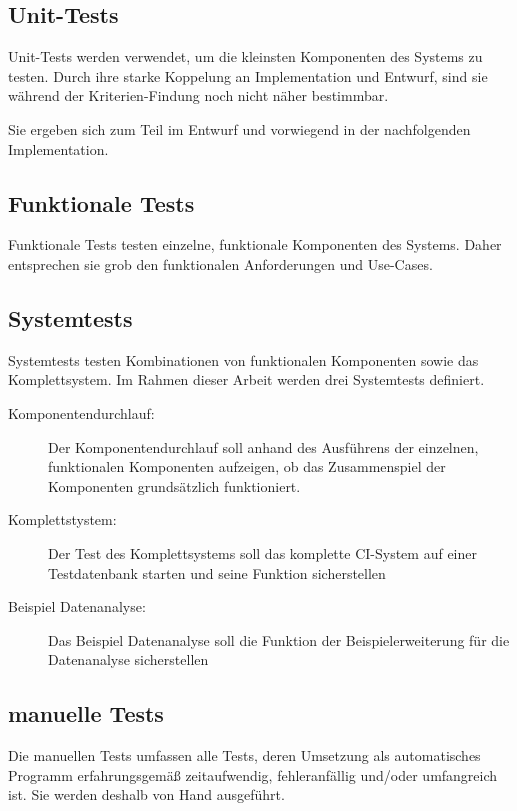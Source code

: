 \subsection{Unit-Tests}

Unit-Tests werden verwendet, um die kleinsten Komponenten des Systems zu testen.
Durch ihre starke Koppelung an Implementation und Entwurf,
sind sie w\"ahrend der Kriterien-Findung noch nicht n\"aher bestimmbar.

Sie ergeben sich zum Teil im Entwurf und vorwiegend in
der nachfolgenden Implementation.

\subsection{Funktionale Tests}

Funktionale Tests testen einzelne, funktionale Komponenten des Systems.
Daher entsprechen sie grob den funktionalen Anforderungen und Use-Cases.

\subsection{Systemtests}

Systemtests testen Kombinationen von funktionalen Komponenten sowie das Komplettsystem.
Im Rahmen dieser Arbeit werden drei Systemtests definiert.


\begin{description}
  \item[Komponentendurchlauf:]
    Der Komponentendurchlauf soll anhand des Ausführens der einzelnen, funktionalen Komponenten aufzeigen,
    ob das Zusammenspiel der Komponenten grunds\"atzlich funktioniert.
  \item[Komplettstystem:]
    Der Test des Komplettsystems soll das komplette CI-System auf einer Testdatenbank starten
    und seine Funktion sicherstellen
  \item[Beispiel Datenanalyse:]
    Das Beispiel Datenanalyse soll die Funktion der Beispielerweiterung für die Datenanalyse sicherstellen
\end{description}

\subsection{manuelle Tests}

Die manuellen Tests umfassen alle Tests,
deren Umsetzung als automatisches Programm erfahrungsgemäß zeitaufwendig,
fehleranfällig und/oder umfangreich ist.
Sie werden deshalb von Hand ausgeführt.

